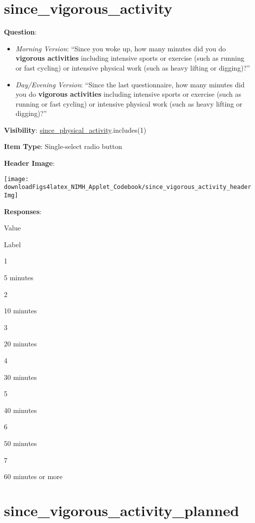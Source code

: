 \documentclass[]{book}
\providecommand{\tightlist}{%
  \setlength{\itemsep}{0pt}\setlength{\parskip}{0pt}}
\begin{document}
\hypertarget{since_vigorous_activity}{%
\section{since\_vigorous\_activity}\label{since_vigorous_activity}}

\textbf{Question}:

\begin{itemize}
\tightlist
\item
  \emph{Morning Version}: ``Since you woke up, how many minutes did you do \textbf{vigorous activities} including intensive sports or exercise (such as running or fast cycling) or intensive physical work (such as heavy lifting or digging)?''
\item
  \emph{Day/Evening Version}: ``Since the last questionnaire, how many minutes did you do \textbf{vigorous activities} including intensive sports or exercise (such as running or fast cycling) or intensive physical work (such as heavy lifting or digging)?''
\end{itemize}

\textbf{Visibility}: \protect\hyperlink{since_physical_activity}{since\_physical\_activity}.includes(1)

\textbf{Item Type}: Single-select radio button

\textbf{Header Image}:

\begin{flushleft}\texttt{[image: downloadFigs4latex\_NIMH\_Applet\_Codebook/since\_vigorous\_activity\_headerImg]} \end{flushleft}

\textbf{Responses}:

Value

Label

1

5 minutes

2

10 minutes

3

20 minutes

4

30 minutes

5

40 minutes

6

50 minutes

7

60 minutes or more

\hypertarget{since_vigorous_activity_planned}{%
\section{since\_vigorous\_activity\_planned}\label{since_vigorous_activity_planned}}
\end{document}
